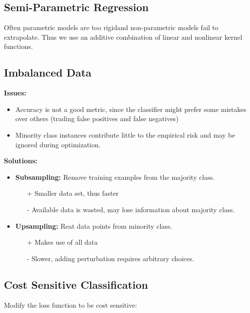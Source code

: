 \documentclass[10pt,a4paper]{scrartcl}
\begin{document}
\begin{multicols*}{2}
\subsection{Semi-Parametric Regression}

Often parametric models are too \glqq rigid\grqq and non-parametric models fail to extrapolate. Thus we use an additive combination of linear and nonlinear kernel functions.


\subsection{Imbalanced Data}

\textbf{Issues:}
\begin{itemize}
\item Accuracy is not a good metric, since the classifier might prefer some mistakes over others (trading false positives and false negatives)
\item Minority class instances contribute little to the empirical risk and may be ignored during optimization.
\end{itemize}

\textbf{Solutions:}
\begin{itemize}
\item \textbf{Subsampling:} Remove training examples from the majority class.
\begin{itemize}
\item[+] Smaller data set, thus faster
\item[-] Available data is wasted, may lose information about majority class.
\end{itemize}
\item \textbf{Upsampling:} Reat data points from minority class.
\begin{itemize}
\item[+] Makes use of all data
\item[-] Slower, adding perturbation requires arbitrary choices.
\end{itemize}
\end{itemize}

\subsection{Cost Sensitive Classification}

Modify the loss function to be cost sensitive:


\end{multicols*}
\end{document}
